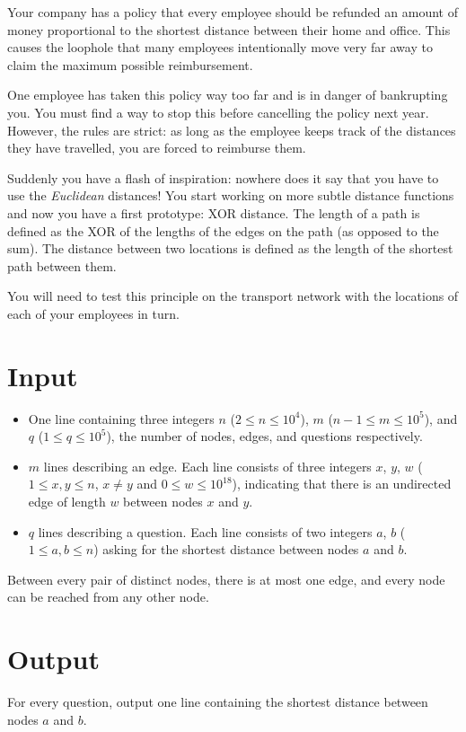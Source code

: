 
\providecommand\maxv{}\renewcommand{\maxv}{10^4}
\providecommand\maxe{}\renewcommand{\maxe}{10^5}
\providecommand\maxq{}\renewcommand{\maxq}{10^5}
\providecommand\maxw{}\renewcommand{\maxw}{10^{18}}

Your company has a policy that every employee should be refunded an amount of money proportional
to the shortest distance between their home and office. This causes the loophole that many employees
intentionally move very far away to claim the maximum possible reimbursement.

One employee has taken this policy way too far and is in danger of bankrupting you. You must find a
way to stop this before cancelling the policy next year. However, the rules are strict: as long as
the employee keeps track of the distances they have travelled, you are forced to reimburse them.

Suddenly you have a flash of inspiration: nowhere does it say that you have to use the \emph{Euclidean}
distances! You start working on more subtle distance functions and now you have a first prototype:
XOR distance. The length of a path is defined as the XOR of the lengths of the edges on the path
(as opposed to the sum). The distance between two locations is defined as the length of the shortest
path between them.

You will need to test this principle on the transport network with the locations of each of your
employees in turn.

\section*{Input}
	\begin{itemize}
		\item One line containing three integers $n$ ($2 \leq n \leq \maxv$), $m$ ($n-1 \leq m \leq \maxe$), and
			$q$ (${1 \leq q \leq \maxq}$),
		the number of nodes, edges, and questions respectively.
		\item $m$ lines describing an edge.
		Each line consists of three integers $x$, $y$, $w$ ($1 \leq x,y \leq n$, $x\neq y$ and $0 \leq w \leq \maxw$),
		indicating that there is an undirected edge of length $w$ between nodes $x$ and $y$.
		\item $q$ lines describing a question.
			Each line consists of two integers $a$, $b$ ($1 \leq a,b \leq n$) asking for the shortest distance between nodes $a$ and $b$.
	\end{itemize}

	Between every pair of distinct nodes, there is at most one edge, and every node can be reached from any other node.

\section*{Output}
For every question, output one line containing the shortest distance between nodes $a$ and $b$.
